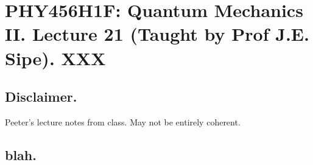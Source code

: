 
%

\chapter{PHY456H1F: Quantum Mechanics II.  Lecture 21 (Taught by Prof J.E. Sipe).  XXX}
\label{chap:qmTwoL21}
{}
\date{Nov XX, 2011}

\beginArtWithToc

\section{Disclaimer.}

Peeter's lecture notes from class.  May not be entirely coherent.

\section{blah.}

\cite{desai2009quantum}

\EndArticle
